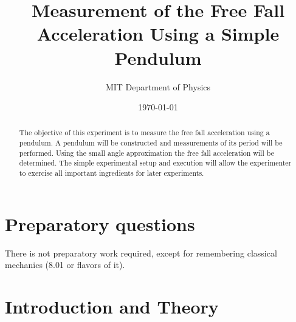 \documentclass[10pt,aps,twocolumn,secnumarabic,balancelastpage,amsmath,amssymb,nofootinbib,floatfix]{revtex4}
\begin{document}
\title{Measurement of the Free Fall Acceleration Using a Simple Pendulum}
\author{MIT Department of Physics}
\date{\today}

\begin{abstract}
  The objective of this experiment is to measure the free fall acceleration using a pendulum. A pendulum will be constructed and measurements of its period will be performed. Using the small angle approximation the free fall acceleration will be determined. The simple experimental setup and execution will allow the experimenter to exercise all important ingredients for later experiments.
\end{abstract}

\maketitle

\section*{Preparatory questions}
There is not preparatory work required, except for remembering classical mechanics (8.01 or flavors of it).

\section{Introduction and Theory}
\end{document}
